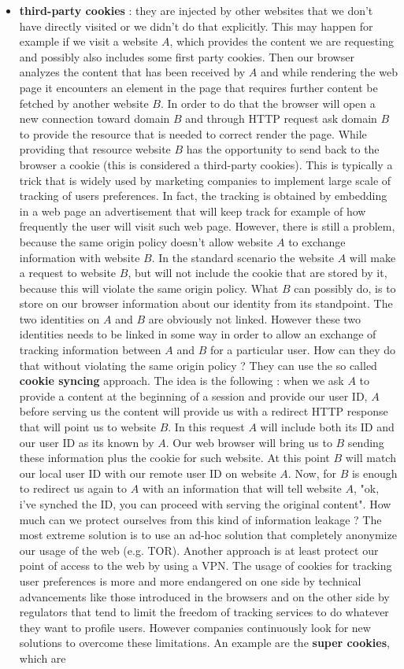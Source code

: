 \begin{itemize}
\item \textbf{third-party cookies} : they are injected by other websites that we don't have directly visited or we didn't do that explicitly. This may happen for example if we visit a website $A$, which provides the content we are requesting and possibly also includes some first party cookies. Then our browser analyzes the content that has been received by $A$ and while rendering the web page it encounters an element in the page that requires further content be fetched by another website $B$. In order to do that the browser will open a new connection toward domain $B$ and through HTTP request ask domain $B$ to provide the resource that is needed to correct render the page. While providing that resource website $B$ has the opportunity to send back to the browser a cookie (this is considered a third-party cookies). This is typically a trick that is widely used by marketing companies to implement large scale of tracking of users preferences. In fact, the tracking is obtained by embedding in a web page an advertisement that will keep track for example of how frequently the user will visit such web page. However, there is still a problem, because the same origin policy doesn't allow website $A$ to exchange information with website $B$. In the standard scenario the website $A$ will make a request to website $B$, but will not include the cookie that are stored by it, because this will violate the same origin policy. What $B$ can possibly do, is to store on our browser information about our identity from its standpoint. The two identities on $A$ and $B$ are obviously not linked. However these two identities needs to be linked in some way in order to allow an exchange of tracking information between $A$ and $B$ for a particular user. How can they do that without violating the same origin policy ? They can use the so called \textbf{cookie syncing} approach. The idea is the following : when we ask $A$ to provide a content at the beginning of a session and provide our user ID, $A$ before serving us the content will provide us with a redirect HTTP response that will point us to website $B$. In this request $A$ will include both its ID and our user ID as its known by $A$. Our web browser will bring us to $B$ sending these information plus the cookie for such website. At this point $B$ will match our local user ID with our remote user ID on website $A$. Now, for $B$ is enough to redirect us again to $A$ with an information that will tell website $A$, "ok, i've synched the ID, you can proceed with serving the original content". How much can we protect ourselves from this kind of information leakage ? The most extreme solution is to use an ad-hoc solution that completely anonymize our usage of the web (e.g. TOR). Another approach is at least protect our point of access to the web by using a VPN. The usage of cookies for tracking user preferences is more and more endangered on one side by technical advancements like those introduced in the browsers and on the other side by regulators that tend to limit the freedom of tracking services to do whatever they want to profile users. However companies continuously look for new solutions to overcome these limitations. An example are the \textbf{super cookies}, which are 
\end{itemize}

